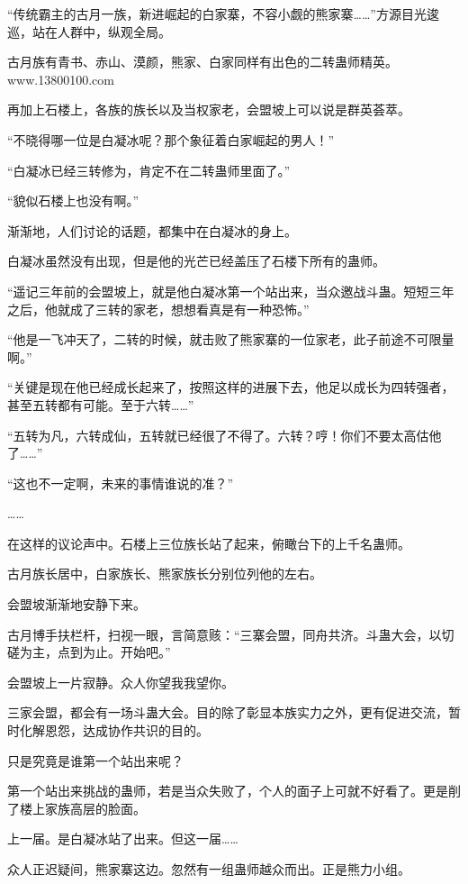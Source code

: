 
\begin{this_body}

“传统霸主的古月一族，新进崛起的白家寨，不容小觑的熊家寨……”方源目光逡巡，站在人群中，纵观全局。

古月族有青书、赤山、漠颜，熊家、白家同样有出色的二转蛊师精英。www.13800100.com

再加上石楼上，各族的族长以及当权家老，会盟坡上可以说是群英荟萃。

“不晓得哪一位是白凝冰呢？那个象征着白家崛起的男人！”

“白凝冰已经三转修为，肯定不在二转蛊师里面了。”

“貌似石楼上也没有啊。”

渐渐地，人们讨论的话题，都集中在白凝冰的身上。

白凝冰虽然没有出现，但是他的光芒已经盖压了石楼下所有的蛊师。

“遥记三年前的会盟坡上，就是他白凝冰第一个站出来，当众邀战斗蛊。短短三年之后，他就成了三转的家老，想想看真是有一种恐怖。”

“他是一飞冲天了，二转的时候，就击败了熊家寨的一位家老，此子前途不可限量啊。”

“关键是现在他已经成长起来了，按照这样的进展下去，他足以成长为四转强者，甚至五转都有可能。至于六转……”

“五转为凡，六转成仙，五转就已经很了不得了。六转？哼！你们不要太高估他了……”

“这也不一定啊，未来的事情谁说的准？”

……

在这样的议论声中。石楼上三位族长站了起来，俯瞰台下的上千名蛊师。

古月族长居中，白家族长、熊家族长分别位列他的左右。

会盟坡渐渐地安静下来。

古月博手扶栏杆，扫视一眼，言简意赅：“三寨会盟，同舟共济。斗蛊大会，以切磋为主，点到为止。开始吧。”

会盟坡上一片寂静。众人你望我我望你。

三家会盟，都会有一场斗蛊大会。目的除了彰显本族实力之外，更有促进交流，暂时化解恩怨，达成协作共识的目的。

只是究竟是谁第一个站出来呢？

第一个站出来挑战的蛊师，若是当众失败了，个人的面子上可就不好看了。更是削了楼上家族高层的脸面。

上一届。是白凝冰站了出来。但这一届……

众人正迟疑间，熊家寨这边。忽然有一组蛊师越众而出。正是熊力小组。


\end{this_body}
